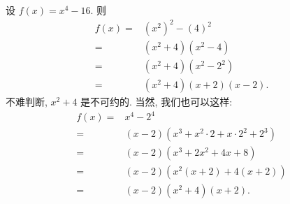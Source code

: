 \begin{example}
    设 $f(x) = x^4 - 16$. 则
    \begin{align*}
        f(x)
        = {} & (x^2)^2 - (4)^2            \\
        = {} & (x^2 + 4) (x^2 - 4)        \\
        = {} & (x^2 + 4) (x^2 - 2^2)      \\
        = {} & (x^2 + 4) (x + 2) (x - 2).
    \end{align*}
    不难判断, $x^2 + 4$ 是不可约的. 当然, 我们也可以这样:
    \begin{align*}
        f(x)
        = {} & x^4 - 2^4                                       \\
        = {} & (x - 2) (x^3 + x^2 \cdot 2 + x \cdot 2^2 + 2^3) \\
        = {} & (x - 2) (x^3 + 2x^2 + 4x + 8)                   \\
        = {} & (x - 2) (x^2 (x + 2) + 4 (x + 2))               \\
        = {} & (x - 2) (x^2 + 4) (x + 2).
    \end{align*}
\end{example}

